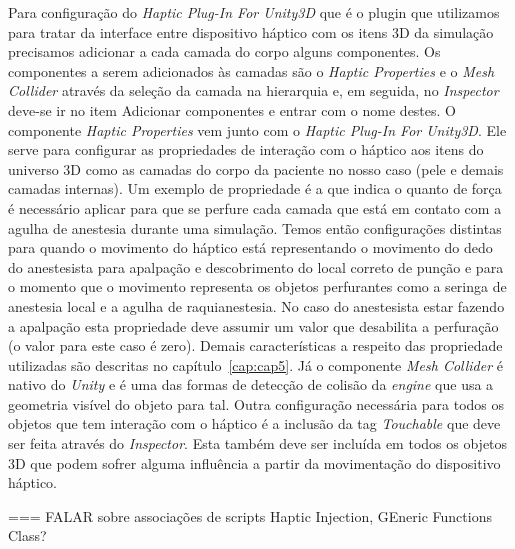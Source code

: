 Para configuração do \textit{Haptic Plug-In For Unity3D} \cite{Poyade2014} que é o plugin que utilizamos para tratar da interface entre dispositivo háptico com os itens 3D da simulação precisamos adicionar a cada camada do corpo alguns componentes. Os componentes a serem adicionados às camadas são o \textit{Haptic Properties} e o \textit{Mesh Collider} através da seleção da camada na hierarquia e, em seguida, no \textit{Inspector} deve-se ir no item Adicionar componentes e entrar com o nome destes. O componente \textit{Haptic Properties} vem junto com o \textit{Haptic Plug-In For Unity3D}. Ele serve para configurar as propriedades de interação com o háptico aos itens do universo 3D como as camadas do corpo da paciente no nosso caso (pele e demais camadas internas). Um exemplo de propriedade é a  que indica o quanto de força é necessário aplicar para que se perfure cada camada que está em contato com a agulha de anestesia durante uma simulação. Temos então configurações distintas para quando o movimento do háptico está representando o movimento do dedo do anestesista para apalpação e descobrimento do local correto de punção e para o momento que o movimento representa os objetos perfurantes como a seringa de anestesia local e a agulha de raquianestesia. No caso do anestesista estar fazendo a apalpação esta propriedade deve assumir um valor que desabilita a perfuração (o valor para este caso é zero). Demais características a respeito das propriedade utilizadas são descritas no capítulo~\ref{cap:cap5}. Já o componente \textit{Mesh Collider} é nativo do \textit{Unity} e é uma das formas de detecção de colisão da \textit{engine} que usa a geometria visível do objeto para tal. Outra configuração necessária para todos os objetos que tem interação com o háptico é a inclusão  da tag \textit{Touchable} que deve ser feita através do \textit{Inspector}. Esta também deve ser incluída em todos os objetos 3D que podem sofrer alguma influência a partir da movimentação do dispositivo háptico.

=== FALAR sobre associações de scripts Haptic Injection, GEneric Functions Class?